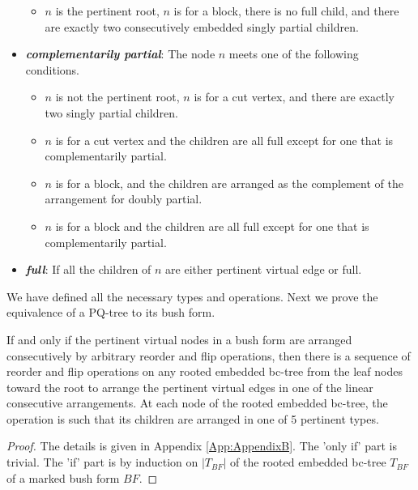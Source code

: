 \documentclass[a4]{jgaa-art}
\newenvironment{definition}[1][Definition]{\begin{trivlist}
\item[\hskip \labelsep {\bfseries #1}]}{\end{trivlist}}
\begin{document}
\begin{definition}
\begin{itemize}
\begin{itemize}
\item $n$ is the pertinent root, $n$ is for a block, there is no full child,
and there are exactly two consecutively embedded singly partial children.

\end{itemize}
\item {\bf \emph{complementarily partial}}: 
The node $n$ meets one of the following conditions.
\begin{itemize}
\item $n$ is not the pertinent root, $n$ is for a cut vertex, and there are exactly two singly partial children.

\item $n$ is for a cut vertex and the children are all full except for one that is complementarily partial.

\item $n$ is for a block, and the children are arranged as the complement of the arrangement for doubly partial.

\item $n$ is for a block and the children are all full except for one that is complementarily partial.
\end{itemize}
\item {\bf \emph{full}}: 
If all the children of $n$ are either pertinent virtual edge or full.
\end{itemize}
\end{definition}

We have defined all the necessary types and operations.
Next we prove the equivalence of a PQ-tree to its bush form.


\begin{lemma}\label{lem:lemma1}
If and only if the pertinent virtual nodes in a bush form are arranged consecutively by arbitrary 
reorder and flip operations, then there is a sequence of reorder and flip operations 
on any rooted embedded bc-tree from the leaf nodes toward the root to arrange the pertinent virtual
edges in one of the linear consecutive arrangements.
At each node of the rooted embedded bc-tree, the operation is such that its children are arranged
in one of 5 pertinent types.
\end{lemma}

\begin{proof}
The details is given in Appendix \ref{App:AppendixB}.
The 'only if' part is trivial.
The 'if' part is by induction on  $|T_{BF}|$ of the rooted embedded bc-tree $T_{BF}$ of a marked bush form $BF$.
\end{proof}
\end{document}
